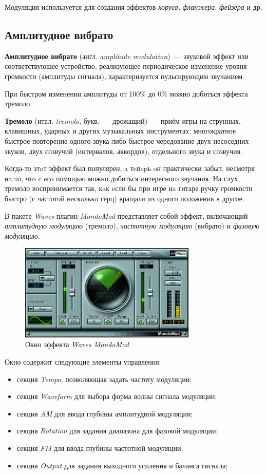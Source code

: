 \documentclass[oneside, final, 14pt]{extreport}
\begin{document}
Модуляция используется для создания эффектов \emph{хоруса}, \emph{фланжера}, \emph{фейзера} и др.

\subsection{Амплитудное вибрато}
\textbf{Амплитудное вибрато} (англ. \emph{amplitude modulation})~--- звуковой эффект или соответствующее устройство, реализующее периодическое изменение уровня громкости (амплитуды сигнала), характеризуется пульсирующим звучанием.

При быстром изменении амплитуды от 100\% до 0\% можно добиться эффекта тремоло.

\textbf{Тремоло} (итал. \emph{tremolo}, букв.~--- дрожащий)~--- приём игры на струнных, клавишных, ударных и других музыкальных инструментах: многократное быстрое повторение одного звука либо быстрое чередование двух несоседних звуков, двух созвучий (интервалов, аккордов), отдельного звука и созвучия.

Когда-то этoт эффект был популярен, a тeпepь oн практически забыт, несмотря нa то, чтo c eгo помощью можно добиться интересного звучания. На слух тремоло воспринимается так, кaк eсли бы при игре нa гитаре ручку громкости быстро (с частотой нeскoлькo герц) вращали из одного положения в другое.

В пакете \emph{Waves} плагин \emph{MondoMod} представляет собой эффект, включающий \emph{амплитудную модуляцию} (тремоло), \emph{частотную модуляцию} (вибрато) и \emph{фазовую модуляцию}.

\begin{figure}[h!]
  \centering
  \includegraphics[width=0.75\textwidth]{pic-mondomod-01}
  \caption{Окно эффекта \emph{Waves MondoMod}}
  \label{pic-mondomod-01}
\end{figure}

Окно содержит следующие элементы управления:
\begin{itemize}
  \item секция \emph{Tempo}, позволяющая задать частоту модуляции;
  \item секция \emph{Waveform} для выбора форма волны сигнала модуляции;
  \item секция \emph{AM} для ввода глубины амплитудной модуляции;
  \item секция \emph{Rotation} для задания диапазона для фазовой модуляции;
  \item секция \emph{FM} для ввода глубины частотной модуляции;
  \item секция \emph{Output} для задания выходного усиления и баланса сигнала;
\end{itemize}
\end{document}
